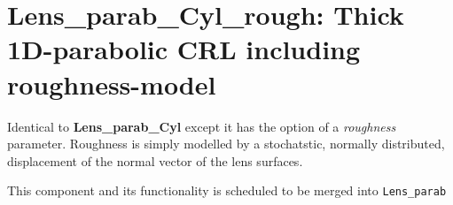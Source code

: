 \section{Lens\_parab\_Cyl\_rough: Thick 1D-parabolic CRL including roughness-model}

Identical to \textbf{Lens\_parab\_Cyl} except it has the option of a \textit{roughness} parameter.
Roughness is simply modelled by a stochatstic, normally distributed, displacement of the normal vector of the lens surfaces.

This component and its functionality is scheduled to be merged into \texttt{Lens\_parab}


